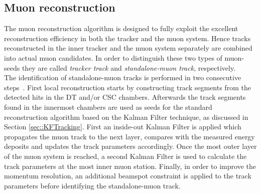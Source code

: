 \subsection{Muon reconstruction}\label{subsec::Muon}

The muon reconstruction algorithm is designed to fully exploit the excellent reconstruction efficiency in both the tracker and the muon system.
Hence tracks reconstructed in the inner tracker and the muon system separately are combined into actual muon candidates. In order to distinguish these two types of muon-seeds they are called \textit{tracker track} and \textit{standalone-muon track}, respectively.
\\
The identification of standalone-muon tracks is performed in two consecutive steps~\cite{}. First local reconstruction starts by constructing track segments from the detected hits in the DT and/or CSC chambers. Afterwards the track segments found in the innermost chambers are used as seeds for the standard reconstruction algorithm based on the Kalman Filter technique, as discussed in Section \ref{sec::KFTracking}. First an inside-out Kalman Filter is applied which propagates the muon track to the next layer, compares with the measured energy deposits and updates the track parameters accordingly. Once the most outer layer of the muon system is reached, a second Kalman Filter is used to calculate the track parameters at the most inner muon station. Finally, in order to improve the momentum resolution, an additional beamspot constraint is applied to the track parameters before identifying the standalone-muon track.

